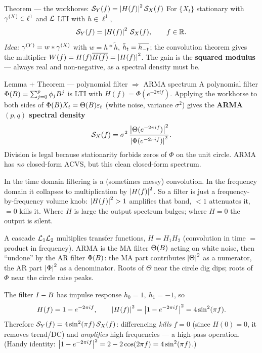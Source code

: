 \documentclass[11pt]{article}
\begin{document}
\begin{result}{Theorem --- the workhorse: $\mathcal{S}_Y(f)=\left\lvert H(f) \right\rvert^2\mathcal{S}_X(f)$}
For $\{X_t\}$ stationary with $\gamma^{(X)}\in\ell^1$ and $\mathcal{L}$ LTI with $h\in\ell^1$,
\[
\mathcal{S}_Y(f)=\left\lvert H(f) \right\rvert^2\,\mathcal{S}_X(f),\qquad f\in\mathbb{R}.
\]
\emph{Idea:} $\gamma^{(Y)}=w*\gamma^{(X)}$ with $w=h*\tilde h$, $\tilde h_t=\overline{h_{-t}}$; the convolution theorem gives the multiplier $W(f)=H(f)\overline{H(f)}=\left\lvert H(f) \right\rvert^2$. The gain is the \textbf{squared modulus} --- always real and non-negative, as a spectral density must be.
\end{result}

\begin{result}{Lemma + Theorem --- polynomial filter $\Rightarrow$ ARMA spectrum}
A polynomial filter $\Phi(B)=\sum_{j=0}^p\phi_jB^j$ is LTI with $H(f)=\Phi(e^{-2\pi i f})$. Applying the workhorse to both sides of $\Phi(B)X_t=\Theta(B)\varepsilon_t$ (white noise, variance $\sigma^2$) gives the \textbf{ARMA$(p,q)$ spectral density}
\[
\mathcal{S}_X(f)=\sigma^2\,\frac{\left\lvert \Theta(e^{-2\pi i f}) \right\rvert^2}{\left\lvert \Phi(e^{-2\pi i f}) \right\rvert^2}.
\]
Division is legal because stationarity forbids zeros of $\Phi$ on the unit circle. ARMA has \emph{no} closed-form ACVS, but this clean closed-form spectrum.
\end{result}

\begin{intu}
In the time domain filtering is a (sometimes messy) convolution. In the frequency domain it collapses to multiplication by $\left\lvert H(f) \right\rvert^2$. So a filter is just a frequency-by-frequency volume knob: $\left\lvert H(f) \right\rvert^2>1$ amplifies that band, $<1$ attenuates it, $=0$ kills it. Where $H$ is large the output spectrum bulges; where $H=0$ the output is silent.
\end{intu}

\begin{intu}
A cascade $\mathcal{L}_1\mathcal{L}_2$ multiplies transfer functions, $H=H_1H_2$ (convolution in time $=$ product in frequency). ARMA is the MA filter $\Theta(B)$ acting on white noise, then ``undone'' by the AR filter $\Phi(B)$: the MA part contributes $\left\lvert \Theta \right\rvert^2$ as a numerator, the AR part $\left\lvert \Phi \right\rvert^2$ as a denominator. Roots of $\Theta$ near the circle dig dips; roots of $\Phi$ near the circle raise peaks.
\end{intu}

\begin{exmpl}[First difference $Y_t=X_t-X_{t-1}$ is high-pass]
The filter $I-B$ has impulse response $h_0=1,\ h_1=-1$, so
\[
H(f)=1-e^{-2\pi i f},\qquad
\left\lvert H(f) \right\rvert^2=\left\lvert 1-e^{-2\pi i f} \right\rvert^2=4\sin^2(\pi f).
\]
Therefore $\mathcal{S}_Y(f)=4\sin^2(\pi f)\,\mathcal{S}_X(f)$: differencing \emph{kills} $f=0$ (since $H(0)=0$, it removes trend/DC) and \emph{amplifies} high frequencies --- a high-pass operation. (Handy identity: $\left\lvert 1-e^{-2\pi i f} \right\rvert^2=2-2\cos(2\pi f)=4\sin^2(\pi f)$.)
\end{exmpl}
\end{document}
